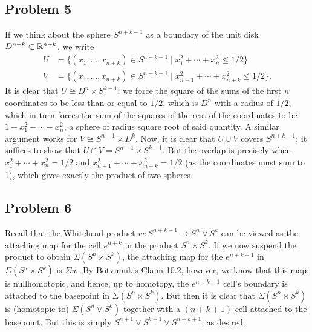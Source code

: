 \documentclass{../mathnotes}
\begin{document}
\subsection*{Problem 5}
If we think about the sphere $S^{n+k-1}$ as a boundary of the unit disk $D^{n+k}\subset\mathbb{R}^{n+k}$,
we write
\begin{align*}
    U &= \{(x_1,\ldots,x_{n+k})\in S^{n+k-1}\mid x_1^2+\cdots+x_n^2\leq 1/2\}\\
    V &= \{(x_1,\ldots,x_{n+k})\in S^{n+k-1}\mid x_{n+1}^2+\cdots+x_{n+k}^2\leq 1/2\}.
\end{align*}
It is clear that $U\cong D^n\times S^{k-1}$: we force the square of the sums of the first $n$ coordinates
to be less than or equal to $1/2$, which is $D^n$ with a radius of $1/2$, which in turn forces
the sum of the squares of the rest of the coordinates to be $1-x_1^2-\cdots-x_n^2$, a sphere of
radius square root of said quantity. A similar argument works for $V\cong S^{n-1}\times D^k$.
Now, it is clear that $U\cup V$ covers $S^{n+k-1}$; it suffices to show that $U\cap V=S^{n-1}\times S^{k-1}$.
But the overlap is precisely when $x_1^2+\cdots+x_n^2=1/2$ and $x_{n+1}^2+\cdots+x_{n+k}^2=1/2$ (as
the coordinates must sum to 1), which gives exactly the product of two spheres.

\subsection*{Problem 6}
Recall that the Whitehead product $w:S^{n+k-1}\to S^n\vee S^k$ can be viewed as the attaching map for
the cell $e^{n+k}$ in the product $S^n\times S^k$. If we now suspend the product to obtain $\Sigma(S^n\times S^k)$,
the attaching map for the $e^{n+k+1}$ in $\Sigma(S^n\times S^k)$ is $\Sigma w$. By Botvinnik's Claim 10.2, however,
we know that this map is nullhomotopic, and hence, up to homotopy, the $e^{n+k+1}$ cell's boundary is attached
to the basepoint in $\Sigma(S^n\times S^k)$. But then it is clear that $\Sigma(S^n\times S^k)$ is (homotopic to)
$\Sigma(S^n\vee S^k)$ together with a $(n+k+1)$-cell attached to the basepoint. But this is simply
$S^{n+1}\vee S^{k+1}\vee S^{n+k+1}$, as desired.
\end{document}
